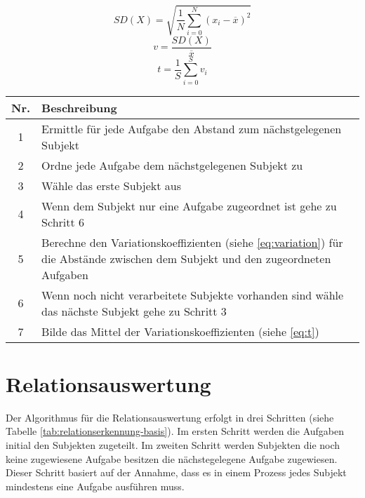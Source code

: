 \begin{equation}
	\label{eq:deviation}
	SD(X)=\sqrt{\frac{1}{N}\sum_{i=0}^{N}\left(x_i - \overline{x}\right)^2} 
\end{equation}
\begin{equation}
	\label{eq:variation}
	v=\frac{SD(X)}{\overline{x}} 
\end{equation}
\begin{equation}
	\label{eq:t}
	t=\frac{1}{S}\sum_{i=0}^{S}v_{i}
\end{equation}
\begin{center}
	\begin{tabularx}
		{1.0\linewidth}{ c X } \textbf{Nr.} & \textbf{Beschreibung} \\
		\hline 1 & Ermittle für jede Aufgabe den Abstand zum nächstgelegenen Subjekt \\
		\hline 2 & Ordne jede Aufgabe dem nächstgelegenen Subjekt zu \\
		\hline 3 & Wähle das erste Subjekt aus \\
		\hline 4 & Wenn dem Subjekt nur eine Aufgabe zugeordnet ist gehe zu Schritt 6 \\
		\hline 5 & Berechne den Variationskoeffizienten (siehe \ref{eq:variation}) für die Abstände zwischen dem Subjekt und den zugeordneten Aufgaben \\
		\hline 6 & Wenn noch nicht verarbeitete Subjekte vorhanden sind wähle das nächste Subjekt gehe zu Schritt 3 \\
		\hline 7 & Bilde das Mittel der Variationskoeffizienten (siehe \ref{eq:t})
	\end{tabularx}
\end{center}

\section{Relationsauswertung} %
\label{sub:relationsauswertung}
Der Algorithmus für die Relationsauswertung erfolgt in drei Schritten (siehe Tabelle \ref{tab:relationserkennung-basis}). Im ersten Schritt werden die Aufgaben initial den Subjekten zugeteilt. Im zweiten Schritt werden Subjekten die noch keine zugewiesene Aufgabe besitzen die nächstegelegene Aufgabe zugewiesen. Dieser Schritt basiert auf der Annahme, dass es in einem Prozess jedes Subjekt mindestens eine Aufgabe ausführen muss.

